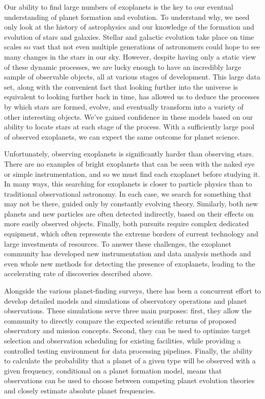 Our ability to find large numbers of exoplanets is the key to our eventual understanding of planet formation and evolution.  To understand why, we need only look at the history of astrophysics and our knowledge of the formation and evolution of stars and galaxies.  Stellar and galactic evolution take place on time scales so vast that not even multiple generations of astronomers could hope to see many changes in the stars in our sky.  However, despite having only a static view of these dynamic processes, we are lucky enough to have an incredibly large sample of observable objects, all at various stages of development.  This large data set, along with the convenient fact that looking further into the universe is equivalent to looking further back in time, has allowed us to deduce the processes by which stars are formed, evolve, and eventually transform into a variety of other interesting objects.  We've gained confidence in these models based on our ability to locate stars at each stage of the process.  With a sufficiently large pool of observed exoplanets, we can expect the same outcome for planet science.

Unfortunately, observing exoplanets is significantly harder than observing stars.  There are no examples of bright exoplanets that can be seen with the naked eye or simple instrumentation, and so we must find each exoplanet before studying it.  In many ways, this searching for exoplanets is closer to particle physics than to traditional observational astronomy.  In each case, we search for something that may not be there, guided only by constantly evolving theory.  Similarly, both new planets and new particles are often detected indirectly, based on their effects on more easily observed objects.  Finally, both pursuits require complex dedicated equipment, which often represents the extreme borders of current technology and large investments of resources.  To answer these challenges, the exoplanet community has developed new instrumentation and data analysis methods and even whole new methods for detecting the presence of exoplanets, leading to the accelerating rate of discoveries described above. 

Alongside the various planet-finding surveys, there has been a concurrent effort to develop detailed models and simulations of observatory operations and planet observations.  These simulations serve three main purposes:  first, they allow the community to directly compare the expected scientific returns of proposed observatory and mission concepts.  Second, they can be used to optimize target selection and observation scheduling for existing facilities, while providing a controlled testing environment for data processing pipelines.  Finally, the ability to calculate the probability that a planet of a given type will be observed with a given frequency, conditional on a planet formation model, means that observations can be used to choose between competing planet evolution theories and closely estimate absolute planet frequencies. 


